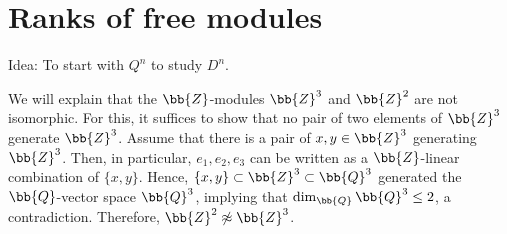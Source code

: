 \section{Ranks of free modules}

\begin{center}
    Idea: To start with $Q^n$ to study $D^n$.
\end{center}
\begin{exmp}
    We will explain that the $\bb{Z}$-modules $\bb{Z}^3$ and $\bb{Z}^2$ are not isomorphic.
    For this, it suffices to show that no pair of two elements of $\bb{Z}^3$ generate $\bb{Z}^3$.
    Assume that there is a pair of $x, y\in\bb{Z}^3$ generating $\bb{Z}^3$.
    Then, in particular, $e_1, e_2, e_3$ can be written as a $\bb{Z}$-linear combination of $\{x, y\}$.
    Hence, $\{x, y\}\subset\bb{Z}^3\subset\bb{Q}^3$ generated the $\bb{Q}$-vector space $\bb{Q}^3$, implying that $\dim_\bb{Q} \bb{Q}^3\leq 2$, a contradiction.
    Therefore, $\bb{Z}^2\not\approx\bb{Z}^3$.
\end{exmp}

